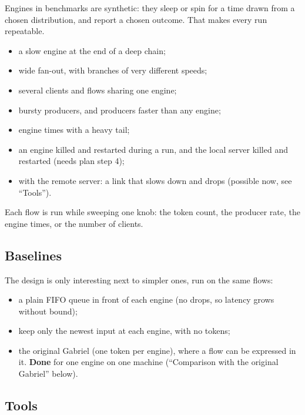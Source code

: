 \documentclass[11pt]{article}
\begin{document}
Engines in benchmarks are synthetic: they sleep or spin for a time drawn from
a chosen distribution, and report a chosen outcome. That makes every run
repeatable.
\begin{itemize}[nosep]
  \item a slow engine at the end of a deep chain;
  \item wide fan-out, with branches of very different speeds;
  \item several clients and flows sharing one engine;
  \item bursty producers, and producers faster than any engine;
  \item engine times with a heavy tail;
  \item an engine killed and restarted during a run, and the local server
        killed and restarted (needs plan step 4);
  \item with the remote server: a link that slows down and drops (possible
        now, see ``Tools'').
\end{itemize}
Each flow is run while sweeping one knob: the token count, the producer rate,
the engine times, or the number of clients.

\subsection{Baselines}

The design is only interesting next to simpler ones, run on the same flows:
\begin{itemize}[nosep]
  \item a plain FIFO queue in front of each engine (no drops, so latency
        grows without bound);
  \item keep only the newest input at each engine, with no tokens;
  \item the original Gabriel (one token per engine), where a flow can be
        expressed in it. \textbf{Done} for one engine on one machine
        (``Comparison with the original Gabriel'' below).
\end{itemize}

\subsection{Tools}
\end{document}
